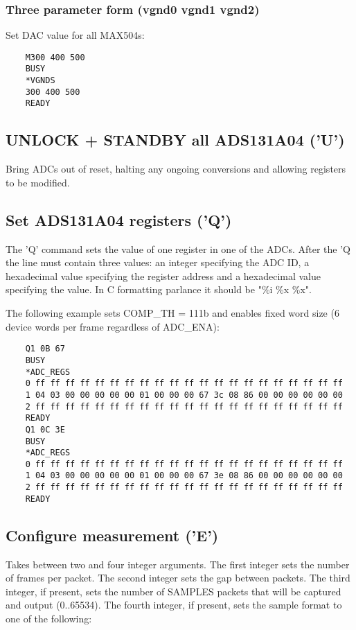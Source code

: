 \documentclass{article}
\begin{document}
\subsubsection{Three parameter form (vgnd0 vgnd1 vgnd2)}

Set DAC value for all MAX504s:

\begin{lstlisting}
    M300 400 500
    BUSY
    *VGNDS
    300 400 500
    READY
\end{lstlisting}

\subsection{UNLOCK + STANDBY all ADS131A04 ('U')}

Bring ADCs out of reset, halting any ongoing conversions and allowing registers to be modified.

\subsection{Set ADS131A04 registers ('Q')}

The 'Q' command sets the value of one register in one of the ADCs.
After the 'Q the line must contain three values: an integer specifying the ADC ID,
a hexadecimal value specifying the register address and a hexadecimal value specifying the value.
In C formatting parlance it should be "\%i \%x \%x".

The following example sets COMP\_TH = 111b and enables fixed word size (6 device words per frame regardless of ADC\_ENA):

\begin{lstlisting}
    Q1 0B 67
    BUSY
    *ADC_REGS
    0 ff ff ff ff ff ff ff ff ff ff ff ff ff ff ff ff ff ff ff ff ff
    1 04 03 00 00 00 00 00 01 00 00 00 67 3c 08 86 00 00 00 00 00 00
    2 ff ff ff ff ff ff ff ff ff ff ff ff ff ff ff ff ff ff ff ff ff
    READY
    Q1 0C 3E
    BUSY
    *ADC_REGS
    0 ff ff ff ff ff ff ff ff ff ff ff ff ff ff ff ff ff ff ff ff ff
    1 04 03 00 00 00 00 00 01 00 00 00 67 3e 08 86 00 00 00 00 00 00
    2 ff ff ff ff ff ff ff ff ff ff ff ff ff ff ff ff ff ff ff ff ff
    READY
\end{lstlisting}

\subsection{Configure measurement ('E')}

Takes between two and four integer arguments.
The first integer sets the number of frames per packet.
The second integer sets the gap between packets.
The third integer, if present, sets the number of SAMPLES packets that will be captured and output (0..65534).
The fourth integer, if present, sets the sample format to one of the following:
\end{document}
